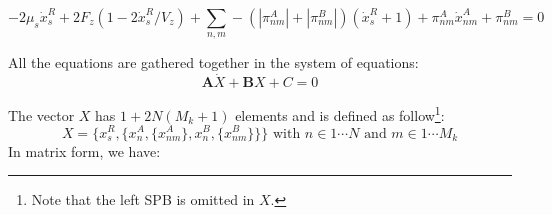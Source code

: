 \documentclass[a4paper,12pt]{article}
\begin{document}
\begin{equation}
  \label{eq:spindle_term}
  - 2\mu_s\dot{x}^R_s + 2F_{z}\left(1 - 2\dot{x}^R_s/V_z\right)%
  + \sum_{n,m}- (|\pi_{nm}^A|  + |\pi_{nm}^B|)(\dot{x}^R_s + 1)%
  + \pi_{nm}^A \dot{x}_{nm}^A + \pi_{nm}^B = 0%
\end{equation}

All the equations are gathered together in the system of equations:
$$
\mathbf{A}\dot{X} + \mathbf{B}X + C = 0
$$

The vector $X$ has $1 + 2N(M_k + 1)$ elements and is defined as
follow\footnote{Note that the left SPB is omitted in $X$.}:
\begin{equation*}
  X = \{x_s^R, \{x_n^A, \{x_{nm}^A\},  x_n^B,%
  \{x_{nm}^B \}\}\}\mbox{ with } n \in 1 \cdots N %
  \mbox{ and } m \in 1 \cdots M_k
\end{equation*}
In matrix form, we have:\\
\end{document}
